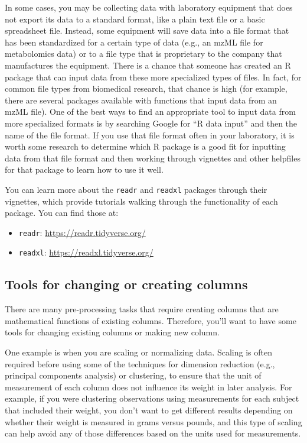 \documentclass[]{tufte-book}
\providecommand{\tightlist}{%
  \setlength{\itemsep}{0pt}\setlength{\parskip}{0pt}}
\begin{document}
In some cases, you may be collecting data with laboratory equipment that does
not export its data to a standard format, like a plain text file or a
basic spreadsheet file. Instead, some equipment will save data into a file
format that has been standardized for a certain type of data (e.g., an mzML
file for metabolomics data) or to a file type that is proprietary to the
company that manufactures the equipment. There is a chance that someone has
created an R package that can input data from these more specialized types of
files. In fact, for common file types from biomedical research, that chance
is high (for example, there are several packages available with functions that
input data from an mzML file). One of the best ways to find an appropriate
tool to input data from more specialized formats is by searching Google for
``R data input'' and then the name of the file format. If you use that file
format often in your laboratory, it is worth some research to determine
which R package is a good fit for inputting data from that file format
and then working through vignettes and other helpfiles for that package to
learn how to use it well.

You can learn more about the \texttt{readr} and \texttt{readxl} packages through their
vignettes, which provide tutorials walking through the functionality of
each package. You can find those at:

\begin{itemize}
\tightlist
\item
  \texttt{readr}: \url{https://readr.tidyverse.org/}
\item
  \texttt{readxl}: \url{https://readxl.tidyverse.org/}
\end{itemize}

\subsection{Tools for changing or creating columns}\label{tools-for-changing-or-creating-columns}

There are many pre-processing tasks that require creating columns that are
mathematical functions of existing columns. Therefore, you'll want to have some
tools for changing existing columns or making new column.

One example is when you are scaling or normalizing data. Scaling is often
required before using some of the techniques for dimension reduction (e.g.,
principal components analysis) or clustering, to ensure that the unit of
measurement of each column does not influence its weight in later analysis. For
example, if you were clustering observations using measurements for each subject
that included their weight, you don't want to get different results depending on
whether their weight is measured in grams versus pounds, and this type of
scaling can help avoid any of those differences based on the units used for
measurements.
\end{document}
